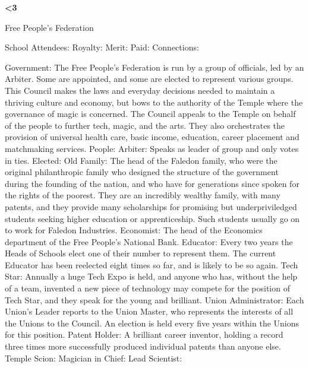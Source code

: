 \documentclass[blue]{GL2020}
\begin{document}
\name{\bTest{}}
\bf{<3}

Free People's Federation %


School Attendees:
	Royalty:
	Merit:
	Paid:
	Connections:

Government:  The Free People's Federation is run by a group of officials, led by an Arbiter. Some are appointed, and some are elected to represent various groups.  This Council makes the laws and everyday decisions needed to maintain a thriving culture and economy, but bows to the authority of the Temple where the governance of magic is concerned.  The Council appeals to the Temple on behalf of the people to further tech, magic, and the arts.  They also orchestrates the provision of universal health care, basic income, education, career placement and matchmaking services.
	People:		Arbiter:	Speaks as leader of group and only votes in ties.
						Elected:	
						Old Family:	The head of the Faledon family, who were the original philanthropic family who designed the structure of the government during the founding of the nation, and who have for generations since spoken for the rights of the poorest.  They are an incredibly wealthy family, with many patents, and they provide many scholarships for promising but underpriviledged students seeking higher education or apprenticeship.  Such students usually go on to work for Faledon Industries.
						Economist:	The head of the Economics department of the Free People's National Bank.
						Educator:		Every two years the Heads of Schools elect one of their number to represent them.  The current Educator has been reelected eight times so far, and is likely to be so again.
						Tech Star:	Annually a huge Tech Expo is held, and anyone who has, without the help of a team, invented a new piece of technology may compete for the position of Tech Star, and they speak for the young and brilliant.
						Union Administrator:	Each Union's Leader reports to the Union Master, who represents the interests of all the Unions to the Council.  An election is held every five years within the Unions for this position.
						Patent Holder:	A brilliant career inventor, holding a record three times more successfully produced individual patents than anyone else.
						Temple Scion:
						Magician in Chief:
						Lead Scientist:
	
\end{document}
